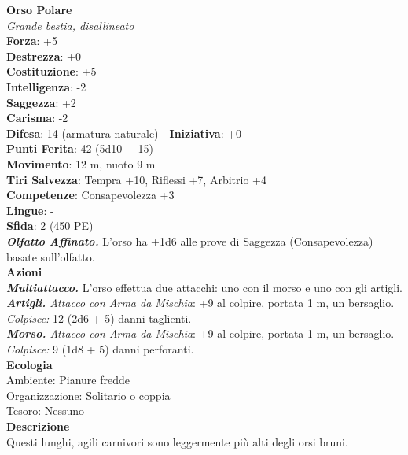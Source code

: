 \begin{multicols}{2}
\medskip\textbf{Orso Polare}\\
\emph{Grande bestia, disallineato}\\
\textbf{Forza}: +5\\
\textbf{Destrezza}: +0\\
\textbf{Costituzione}: +5\\
\textbf{Intelligenza}: -2\\
\textbf{Saggezza}: +2\\
\textbf{Carisma}: -2\\
\textbf{Difesa}: 14 (armatura naturale) - \textbf{Iniziativa}: +0\\
\textbf{Punti Ferita}: 42 (5d10 + 15)\\
\textbf{Movimento}: 12 m, nuoto 9 m\\
\textbf{Tiri Salvezza}: Tempra +10, Riflessi +7, Arbitrio +4 \\
\textbf{Competenze}: Consapevolezza +3\\
\textbf{Lingue}: -\\
\textbf{Sfida}: 2 (450 PE)\smallskip\\
\emph{\textbf{Olfatto Affinato.}} L'orso ha +1d6 alle prove di Saggezza (Consapevolezza) basate sull'olfatto.\\
\smallskip\textbf{Azioni}\\
\emph{\textbf{Multiattacco.}} L'orso effettua due attacchi: uno con il morso e uno con gli artigli.\\
\emph{\textbf{Artigli.} Attacco con Arma da Mischia}: +9 al colpire, portata 1 m, un bersaglio.\\
\emph{Colpisce:} 12 (2d6 + 5) danni taglienti.\\
\emph{\textbf{Morso.} Attacco con Arma da Mischia}: +9 al colpire, portata 1 m, un bersaglio.\\
\emph{Colpisce:} 9 (1d8 + 5) danni perforanti.\\
\textbf{Ecologia}\\
Ambiente: Pianure fredde\\
Organizzazione: Solitario o coppia\\
Tesoro: Nessuno\\
\textbf{Descrizione}\\

Questi lunghi, agili carnivori sono leggermente più alti degli orsi bruni. \\


\end{multicols}

